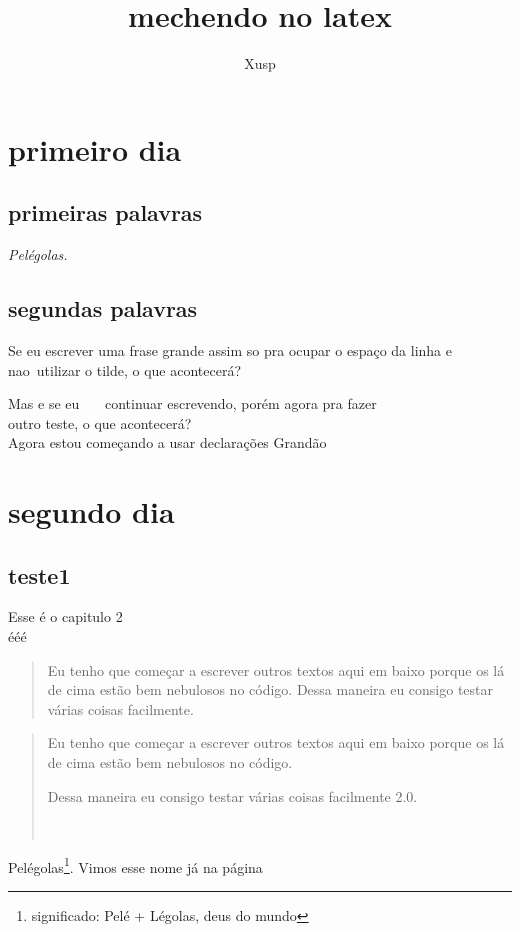 \documentclass[a4paper,11pt]{report}
\title{mechendo no latex}
\author{Xusp}
\begin{document}
\maketitle
\tableofcontents
\chapter{primeiro dia}
\section{primeiras palavras} \label{pp}
\textit{
Pel\'{e}golas.
}

\section{segundas palavras}

Se eu  escrever uma frase grande assim so pra ocupar o espa\c{c}o da linha e nao~utilizar o tilde, o que acontecer\'{a}? \\ %
\bigskip %

Mas e se eu \ \ \ continuar escrevendo, por\'{e}m agora pra fazer \\ outro teste, o que acontecer\'{a}? \\ %
\medskip
{\tiny Agora estou come\c{c}ando a usar declara\c{c}\~{o}es} {\LARGE Grand\~{a}o}\\

\chapter{segundo dia}
\section{teste1} \label{teste1}

Esse \'{e} o capitulo 2\\
ééé \\ %
\begin{quote}
Eu tenho que começar a escrever outros textos aqui em baixo porque os lá de cima estão bem nebulosos no código. Dessa maneira eu consigo testar várias coisas facilmente. \\
\end{quote}
\begin{quotation}
Eu tenho que começar a escrever outros textos aqui em baixo porque os lá de cima estão bem nebulosos no código.
\begin{em}Dessa maneira eu consigo testar várias coisas facilmente 2.0.
\end{em} \\
\end{quotation}
Pelégolas\footnote{significado: Pelé + Légolas, deus do mundo}.
Vimos esse nome já na página \pageref {pp}
\end{document}
